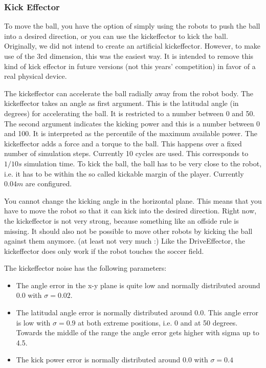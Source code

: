 \subsubsection{Kick Effector}
\label{sec:kickeffector}
To move the ball, you have the option of simply using the robots to
push the ball into a desired direction, or you can use the
kickeffector to kick the ball. Originally, we did not intend to create
an artificial kickeffector. However, to make use of the 3rd dimension,
this was the easiest way. It is intended to remove this kind of kick
effector in future versions (not this years' competition) in favor of
a real physical device.

The kickeffector can accelerate the ball radially away from the robot
body. The kickeffector takes an angle as first argument. This is the
latitudal angle (in degrees) for accelerating the ball. It is
restricted to a number between 0 and 50. The second argument indicates
the kicking power and this is a number between 0 and 100. It is
interpreted as the percentile of the maximum available power. The
kickeffector adds a force and a torque to the ball. This happens over
a fixed number of simulation steps. Currently 10 cycles are used. This
corresponds to $1/10s$ simulation time. To kick the ball, the ball has
to be very close to the robot, i.e. it has to be within the so called
kickable margin of the player. Currently $0.04m$ are configured.

You cannot change the kicking angle in the horizontal plane. This
means that you have to move the robot so that it can kick into the
desired direction. Right now, the kickeffector is not very strong,
because something like an offside rule is missing. It should also not
be possible to move other robots by kicking the ball against them
anymore. (at least not very much :) Like the DriveEffector, the
kickeffector does only work if the robot touches the soccer field.

The kickeffector noise has the following parameters: 
\begin{itemize}
\item The angle error in the x-y plane is quite low and normally distributed
around $0.0$ with $\sigma = 0.02$.
\item The latitudal angle error is normally distributed around $0.0$. This
angle error is low with $\sigma = 0.9$ at both extreme positions, i.e. 0
and at 50 degrees. Towards the middle of the range the angle error
gets higher with sigma up to 4.5.
\item The kick power error is normally distributed around $0.0$ with $\sigma =
0.4$
\end{itemize}

